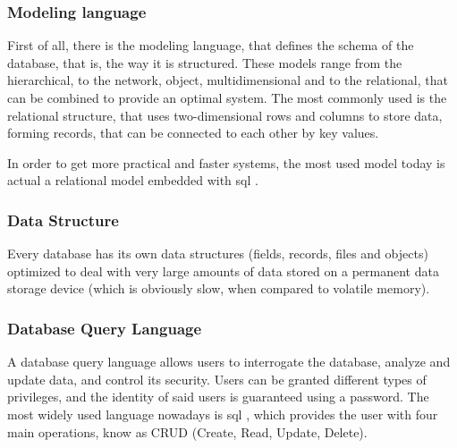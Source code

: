\subsubsection{Modeling language}
First of all, there is the modeling language, that defines the schema of the database, that is, the way it is structured. These models range from the hierarchical, to the network, object, multidimensional and to the relational, that can be combined to provide an optimal system. The most commonly used is the relational structure, that uses two-dimensional rows and columns to store data, forming records, that can be connected to each other by key values. 

In order to get more practical and faster systems, the most used model today is actual a relational model embedded with \ac{sql} .

\subsubsection{Data Structure}
Every database has its own data structures (fields, records, files and objects) optimized to deal with very large amounts of data stored on a permanent data storage device (which is obviously slow, when compared to volatile memory).

\subsubsection{Database Query Language}
A database query language allows users to interrogate the database, analyze and update data, and control its security. Users can be granted different types of privileges, and the identity of said users is guaranteed using a password. The most widely used language nowadays is \ac{sql} , which provides the user with four main operations, know as CRUD (Create, Read, Update, Delete).  

